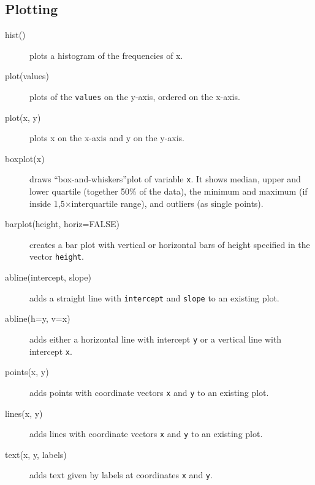 \documentclass[a4paper,9pt]{extarticle}
\begin{document}
\begin{multicols}{3}
\section{Plotting}
\begin{description}
\item[hist()] plots a histogram of the frequencies of x.
\item[plot(values)] plots of the \texttt{values} on the y-axis, ordered on the x-axis.
\item[plot(x, y)] plots x on the x-axis and y on the y-axis.
\item[boxplot(x)] draws ``box-and-whiskers''plot of variable \texttt{x}. It shows median, upper and lower quartile (together 50\% of the data), the minimum and maximum (if inside 1,5$\times$interquartile range), and outliers (as single points).
\item[barplot(height, horiz=FALSE)] creates a bar plot with vertical or horizontal bars of height specified in the vector \texttt{height}.
\item[abline(intercept, slope)] adds a straight line with \texttt{intercept} and \texttt{slope} to an existing plot. 
\item[abline(h=y, v=x)] adds either a horizontal line with intercept \texttt{y} or a vertical line with intercept \texttt{x}.
\item[points(x, y)] adds points with coordinate vectors \texttt{x} and \texttt{y} to an existing plot.
\item[lines(x, y)] adds lines with coordinate vectors \texttt{x} and \texttt{y} to an existing plot.
\item[text(x, y, labels)] adds text given by labels at coordinates \texttt{x} and \texttt{y}.
\end{description}



\end{multicols}
\end{document}
